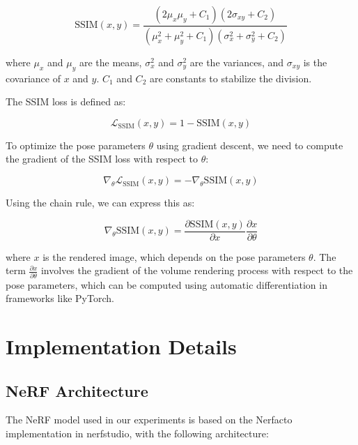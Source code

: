 \begin{equation}
\text{SSIM}(x, y) = \frac{(2\mu_x\mu_y + C_1)(2\sigma_{xy} + C_2)}{(\mu_x^2 + \mu_y^2 + C_1)(\sigma_x^2 + \sigma_y^2 + C_2)}
\end{equation}

where $\mu_x$ and $\mu_y$ are the means, $\sigma_x^2$ and $\sigma_y^2$ are the variances, and $\sigma_{xy}$ is the covariance of $x$ and $y$. $C_1$ and $C_2$ are constants to stabilize the division.

The SSIM loss is defined as:

\begin{equation}
\mathcal{L}_{\text{SSIM}}(x, y) = 1 - \text{SSIM}(x, y)
\end{equation}

To optimize the pose parameters $\theta$ using gradient descent, we need to compute the gradient of the SSIM loss with respect to $\theta$:

\begin{equation}
\nabla_\theta \mathcal{L}_{\text{SSIM}}(x, y) = -\nabla_\theta \text{SSIM}(x, y)
\end{equation}

Using the chain rule, we can express this as:

\begin{equation}
\nabla_\theta \text{SSIM}(x, y) = \frac{\partial \text{SSIM}(x, y)}{\partial x} \frac{\partial x}{\partial \theta}
\end{equation}

where $x$ is the rendered image, which depends on the pose parameters $\theta$. The term $\frac{\partial x}{\partial \theta}$ involves the gradient of the volume rendering process with respect to the pose parameters, which can be computed using automatic differentiation in frameworks like PyTorch.

\section{Implementation Details}

\subsection{NeRF Architecture}
The NeRF model used in our experiments is based on the Nerfacto implementation in nerfstudio, with the following architecture:

